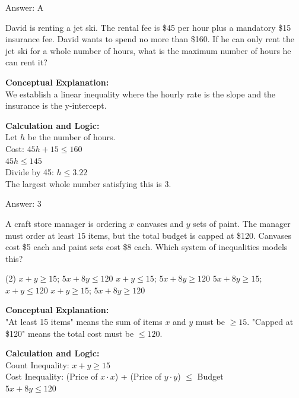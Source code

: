 \documentclass[11pt,paper=a4,answers]{exam}
\begin{document}
\begin{questions}
\begin{solution}
\vspace{15pt}
Answer: \colorbox{yellow!100}{A}
\end{solution}

\question
David is renting a jet ski. The rental fee is \$45 per hour plus a mandatory \$15 insurance fee. David wants to spend no more than \$160. If he can only rent the jet ski for a whole number of hours, what is the maximum number of hours he can rent it?

\begin{solution}
\textbf{Conceptual Explanation:} \\
We establish a linear inequality where the hourly rate is the slope and the insurance is the y-intercept.

\vspace{10pt}
\textbf{Calculation and Logic:} \\
Let $h$ be the number of hours. \\
Cost: $45h + 15 \le 160$ \\
$45h \le 145$ \\
Divide by 45: $h \le 3.22$ \\
The largest whole number satisfying this is 3.

\vspace{15pt}
Answer: \colorbox{yellow!100}{3}
\end{solution}

\question
A craft store manager is ordering $x$ canvases and $y$ sets of paint. The manager must order at least 15 items, but the total budget is capped at \$120. Canvases cost \$5 each and paint sets cost \$8 each. Which system of inequalities models this?
\begin{tasks}(2)
    \task $x + y \ge 15$; $5x + 8y \le 120$
    \task $x + y \le 15$; $5x + 8y \ge 120$
    \task $5x + 8y \ge 15$; $x + y \le 120$
    \task $x + y \ge 15$; $5x + 8y \ge 120$
\end{tasks}

\begin{solution}
\textbf{Conceptual Explanation:} \\
"At least 15 items" means the sum of items $x$ and $y$ must be $\ge 15$. "Capped at \$120" means the total cost must be $\le 120$.

\vspace{10pt}
\textbf{Calculation and Logic:} \\
Count Inequality: $x + y \ge 15$ \\
Cost Inequality: (Price of $x \cdot x$) + (Price of $y \cdot y$) $\le$ Budget \\
$5x + 8y \le 120$


\end{solution}
\end{questions}
\end{document}
